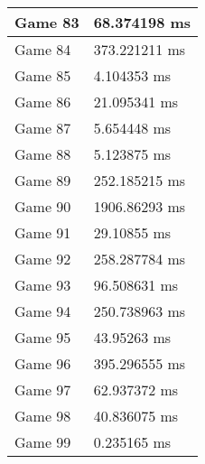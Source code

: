 \begin{tabular}{|l|l|}
	Game 83 & 68.374198 ms \\ \hline
	Game 84 & 373.221211 ms \\ \hline
	Game 85 & 4.104353 ms \\ \hline
	Game 86 & 21.095341 ms \\ \hline
	Game 87 & 5.654448 ms \\ \hline
	Game 88 & 5.123875 ms \\ \hline
	Game 89 & 252.185215 ms \\ \hline
	Game 90 & 1906.86293 ms \\ \hline
	Game 91 & 29.10855 ms \\ \hline
	Game 92 & 258.287784 ms \\ \hline
	Game 93 & 96.508631 ms \\ \hline
	Game 94 & 250.738963 ms \\ \hline
	Game 95 & 43.95263 ms \\ \hline
	Game 96 & 395.296555 ms \\ \hline
	Game 97 & 62.937372 ms \\ \hline
	Game 98 & 40.836075 ms \\ \hline
	Game 99 & 0.235165 ms \\ \hline
\end{tabular}
